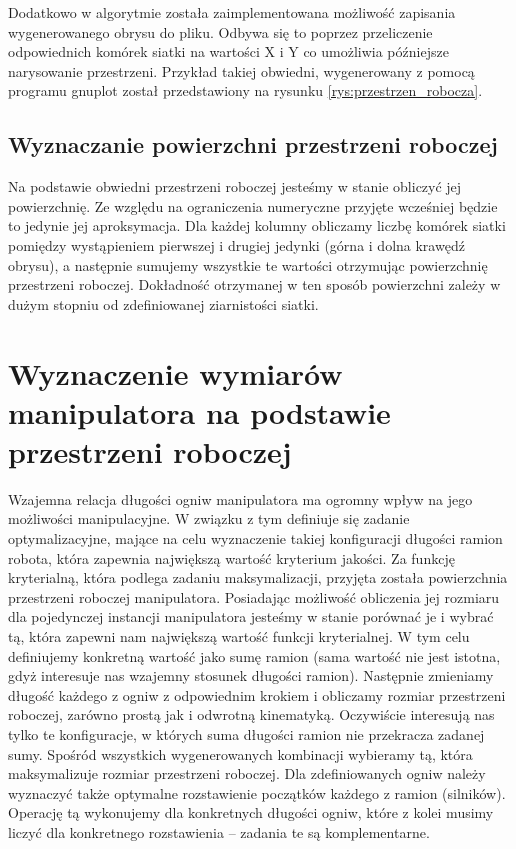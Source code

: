 \documentclass[printmode]{mgr}
\begin{document}
Dodatkowo w algorytmie została zaimplementowana możliwość zapisania wygenerowanego obrysu do pliku. 
Odbywa się to poprzez przeliczenie odpowiednich komórek siatki na wartości X i Y co umożliwia
późniejsze narysowanie przestrzeni. Przykład takiej obwiedni, wygenerowany z pomocą programu gnuplot
został przedstawiony na rysunku \ref{rys:przestrzen_robocza}. 

\subsection{Wyznaczanie powierzchni przestrzeni roboczej} 
Na podstawie obwiedni przestrzeni roboczej jesteśmy w stanie obliczyć jej powierzchnię. 
Ze względu na ograniczenia numeryczne przyjęte wcześniej będzie to jedynie jej aproksymacja. 
Dla każdej kolumny obliczamy liczbę komórek siatki pomiędzy wystąpieniem pierwszej i drugiej jedynki
(górna i dolna krawędź obrysu), a następnie sumujemy wszystkie te wartości otrzymując powierzchnię przestrzeni
roboczej. Dokładność otrzymanej w ten sposób powierzchni zależy w dużym stopniu od zdefiniowanej
ziarnistości siatki. 

\section{Wyznaczenie wymiarów manipulatora na podstawie przestrzeni roboczej}
Wzajemna relacja długości ogniw manipulatora ma ogromny wpływ na jego możliwości manipulacyjne. W związku z tym definiuje się
zadanie optymalizacyjne, mające na celu wyznaczenie takiej konfiguracji długości ramion robota, która zapewnia największą
wartość kryterium jakości. Za funkcję kryterialną, która podlega zadaniu maksymalizacji, przyjęta została powierzchnia 
przestrzeni roboczej manipulatora.
Posiadając możliwość obliczenia jej rozmiaru dla pojedynczej instancji 
manipulatora jesteśmy w stanie porównać je i wybrać tą, która zapewni nam największą wartość funkcji kryterialnej.
W tym celu definiujemy konkretną wartość jako sumę ramion (sama wartość nie jest istotna, gdyż
interesuje nas wzajemny stosunek długości ramion). Następnie zmieniamy długość każdego z ogniw z odpowiednim krokiem
i obliczamy rozmiar przestrzeni roboczej, zarówno prostą jak i odwrotną kinematyką. Oczywiście interesują nas tylko te
konfiguracje, w których suma długości ramion nie przekracza zadanej sumy. Spośród wszystkich wygenerowanych kombinacji wybieramy tą,
która maksymalizuje rozmiar przestrzeni roboczej. Dla zdefiniowanych ogniw należy wyznaczyć także optymalne rozstawienie
początków każdego z ramion (silników). Operację tą wykonujemy dla konkretnych długości ogniw, które z kolei musimy liczyć dla 
konkretnego rozstawienia -- zadania te są komplementarne.
\end{document}
